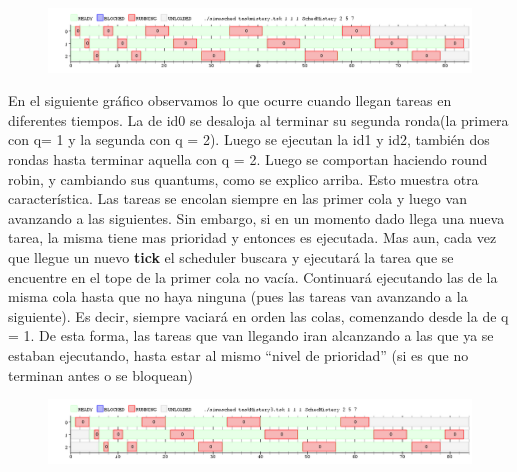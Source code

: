 \documentclass[10pt, a4paper]{article}
\begin{document}
\begin{figure}[H]
  	\centering
   	\includegraphics[width=1\textwidth]
   	 {imgs/mistery2.png}
	\caption{}
\end{figure}

En el siguiente gráfico observamos lo que ocurre cuando llegan tareas en diferentes tiempos. La de id0 se desaloja al terminar su segunda ronda(la primera con q= 1 y la segunda con q = 2). Luego se ejecutan la id1 y id2, también dos rondas hasta terminar aquella con q = 2. Luego se comportan haciendo round robin, y cambiando sus quantums, como se explico arriba.
Esto muestra otra característica. Las tareas se encolan siempre en las primer cola y luego van avanzando a las siguientes. Sin embargo, si en un momento dado llega una nueva tarea, la misma tiene mas prioridad y entonces es ejecutada. Mas aun, cada vez que llegue un nuevo \textbf{tick} el scheduler buscara y ejecutará la tarea que se encuentre en el tope de la primer cola no vacía. Continuará ejecutando las de la misma cola hasta que no haya ninguna (pues las tareas van avanzando a la siguiente). Es decir, siempre vaciará en orden las colas, comenzando desde la de q = 1.
De esta forma, las tareas que van llegando iran alcanzando a las que ya se estaban ejecutando, hasta estar al mismo ``nivel de prioridad'' (si es que no terminan antes o se bloquean)

\begin{figure}[H]
  	\centering
   	\includegraphics[width=1\textwidth]
   	 {imgs/mistery3.png}
	\caption{}
\end{figure}
\end{document}
